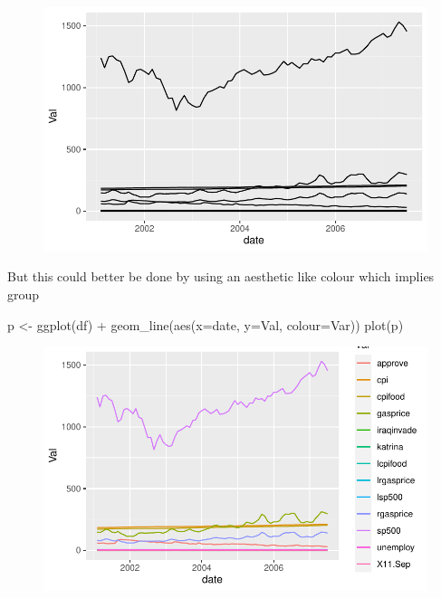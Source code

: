 \documentclass[
  letterpaper,
]{book}
\newenvironment{Shaded}{\begin{snugshade}}{\end{snugshade}}
\newcommand{\AttributeTok}[1]{\textcolor[rgb]{0.40,0.45,0.13}{#1}}
\newcommand{\FunctionTok}[1]{\textcolor[rgb]{0.28,0.35,0.67}{#1}}
\newcommand{\NormalTok}[1]{\textcolor[rgb]{0.00,0.23,0.31}{#1}}
\newcommand{\OtherTok}[1]{\textcolor[rgb]{0.00,0.23,0.31}{#1}}
\newcommand{\SpecialCharTok}[1]{\textcolor[rgb]{0.37,0.37,0.37}{#1}}
\begin{document}
\begin{figure}[H]

{\centering \includegraphics{Appendix1_files/figure-pdf/unnamed-chunk-8-1.pdf}

}

\end{figure}

But this could better be done by using an aesthetic like colour which
implies group

\begin{Shaded}
\begin{Highlighting}[]
\NormalTok{p  }\OtherTok{\textless{}{-}} \FunctionTok{ggplot}\NormalTok{(df) }\SpecialCharTok{+}
  \FunctionTok{geom\_line}\NormalTok{(}\FunctionTok{aes}\NormalTok{(}\AttributeTok{x=}\NormalTok{date, }\AttributeTok{y=}\NormalTok{Val, }\AttributeTok{colour=}\NormalTok{Var))}
\FunctionTok{plot}\NormalTok{(p)}
\end{Highlighting}
\end{Shaded}

\begin{figure}[H]

{\centering \includegraphics{Appendix1_files/figure-pdf/unnamed-chunk-9-1.pdf}

}

\end{figure}
\end{document}

